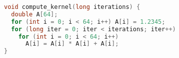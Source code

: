 \begin{lstlisting}[language=C,caption={Excerpt from compute kernel implementation.},label={lst:compute-kernel},style=codeblock,float]
void compute_kernel(long iterations) {
  double A[64];
  for (int i = 0; i < 64; i++) A[i] = 1.2345;
  for (long iter = 0; iter < iterations; iter++)
    for (int i = 0; i < 64; i++)
      A[i] = A[i] * A[i] + A[i];
}
\end{lstlisting}
